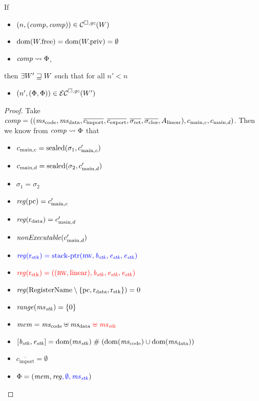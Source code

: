 \documentclass[a4paper]{article}
\begin{document}
\begin{lemma}
  \label{lem:compat-initial-ec}
  If
  \begin{itemize}
  \item $\npair{(\var{comp},\var{comp})} \in \lrcomp(W)$
  \item $\dom(\pwfree) = \dom(\pwpriv) = \emptyset$
  \item $\var{comp} \rightsquigarrow \Phi$,
  \end{itemize}
  then $\exists W' \future W$ such that for all $n' < n$
  \begin{itemize}
  \item $\npair[n']{(\Phi,\Phi)}\in\lrec(W')$
  \end{itemize}
\end{lemma}
\begin{proof}
  Take $\var{comp} = ((\mscode, \msdata, \overline{c_{\mathrm{import}}}, \overline{c_{\mathrm{export}}}, \sigrets, \sigcloss,A_\linear),  c_{\mathrm{main},c}, c_{\mathrm{main},d})$.
  Then we know from $\var{comp} \rightsquigarrow \Phi$ that
  \begin{itemize}
  \item $c_{\mathrm{main},c} = \sealed{\sigma_1, c_{\mathrm{main},c}'}$ 
  \item $c_{\mathrm{main},d} = \sealed{\sigma_2, c_{\mathrm{main},d}'}$
  \item $\sigma_1 = \sigma_2$
  \item $\reg(\pcreg) = c_{\mathrm{main},c}'$
  \item $\reg(\rdata) = c_{\mathrm{main},d}'$ 
  \item $\nonExec{c_{\mathrm{main},d}'}$
  \item $\src{\reg(\rstk) = \stkptr{\rw,\baddr_\stk,\eaddr_\stk,\eaddr_\stk}}$ 
  \item $\trg{\reg(\rstk) = ((\rw,\linear),\baddr_\stk,\eaddr_\stk,\eaddr_\stk)}$ 
  \item $\reg(\RegName \setminus \{\pcreg,\rdata,\rstk\}) = 0$
  \item $\range{\ms_\stk} = \{0\}$
  \item $\mem = \mscode \uplus \msdata \trg{\;\uplus\; \ms_\stk}$
  \item $[\baddr_\stk,\eaddr_\stk] = \dom(\ms_\stk ) \mathrel{\#} (\dom(\mscode) \cup \dom(\msdata))$
  \item $\overline{c_{\mathrm{import}}} = \emptyset$
  \item $\Phi = (\mem, \reg\src{, \emptyset, \ms_\stk})$
  \end{itemize}


\end{proof}
\end{document}
